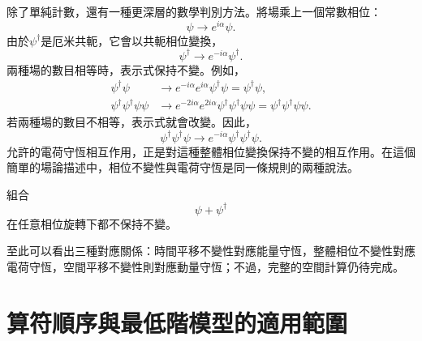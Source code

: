 除了單純計數，還有一種更深層的數學判別方法。將場乘上一個常數相位：
\begin{equation}
\psi\longrightarrow e^{i\alpha}\psi.
\end{equation}
由於\(\psi^\dagger\)是厄米共軛，它會以共軛相位變換，
\begin{equation}
\psi^\dagger\longrightarrow e^{-i\alpha}\psi^\dagger.
\end{equation}
兩種場的數目相等時，表示式保持不變。例如，
\begin{align}
\psi^\dagger\psi
&\longrightarrow
e^{-i\alpha}e^{i\alpha}\psi^\dagger\psi
=\psi^\dagger\psi,\\
\psi^\dagger\psi^\dagger\psi\psi
&\longrightarrow
e^{-2i\alpha}e^{2i\alpha}
\psi^\dagger\psi^\dagger\psi\psi
=\psi^\dagger\psi^\dagger\psi\psi.
\end{align}
若兩種場的數目不相等，表示式就會改變。因此，
\begin{equation}
\psi^\dagger\psi^\dagger\psi
\longrightarrow
e^{-i\alpha}\psi^\dagger\psi^\dagger\psi.
\end{equation}
允許的電荷守恆相互作用，正是對這種整體相位變換保持不變的相互作用。在這個簡單的場論描述中，相位不變性與電荷守恆是同一條規則的兩種說法。

組合
\begin{equation}
\psi+\psi^\dagger
\end{equation}
在任意相位旋轉下都不保持不變。

\begin{classroomqa}
\end{classroomqa}

\begin{classroomqa}
\end{classroomqa}

至此可以看出三種對應關係：時間平移不變性對應能量守恆，整體相位不變性對應電荷守恆，空間平移不變性則對應動量守恆；不過，完整的空間計算仍待完成。

\section{算符順序與最低階模型的適用範圍}

